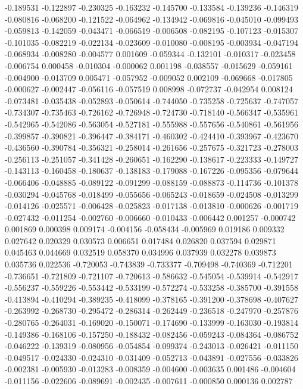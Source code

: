 -0.189531
-0.122897
-0.230325
-0.163232
-0.145700
-0.133584
-0.139236
-0.146319
-0.080816
-0.068200
-0.121522
-0.064962
-0.134942
-0.069816
-0.045010
-0.099493
-0.059813
-0.142059
-0.043471
-0.066519
-0.006508
-0.082195
-0.107123
-0.015307
-0.101035
-0.082219
-0.022134
-0.023609
-0.010080
-0.008195
-0.003934
-0.047194
-0.068934
-0.008280
-0.004577
0.001609
-0.059344
-0.132101
-0.010317
-0.023458
-0.006754
0.000458
-0.010304
-0.000062
0.001198
-0.038557
-0.015629
-0.059161
-0.004900
-0.013709
0.005471
-0.057952
-0.009052
0.002109
-0.069668
-0.017805
-0.000627
-0.002447
-0.056116
-0.057519
0.008998
-0.072737
-0.042954
0.008124
-0.073481
-0.035438
-0.052893
-0.050614
-0.744050
-0.735258
-0.725637
-0.747057
-0.734307
-0.735463
-0.726162
-0.726948
-0.724730
-0.718140
-0.566347
-0.535961
-0.542965
-0.542086
-0.563054
-0.527181
-0.555988
-0.557656
-0.540861
-0.561956
-0.399857
-0.390821
-0.396447
-0.384171
-0.460302
-0.424410
-0.393967
-0.423670
-0.436560
-0.390784
-0.356321
-0.258014
-0.261656
-0.257675
-0.321723
-0.278003
-0.256113
-0.251057
-0.341428
-0.260651
-0.162290
-0.138617
-0.223333
-0.149727
-0.143113
-0.160458
-0.180637
-0.138183
-0.179088
-0.167226
-0.095356
-0.079644
-0.066406
-0.048885
-0.089122
-0.091299
-0.088159
-0.088873
-0.114736
-0.101378
-0.030294
-0.045768
-0.018499
-0.055656
-0.065243
-0.018659
-0.024508
-0.013299
-0.014126
-0.025571
-0.006428
-0.025823
-0.017138
-0.013810
-0.000626
-0.001719
-0.027432
-0.011254
-0.002760
-0.006660
-0.010433
-0.006442
0.001257
-0.000742
0.001869
0.000398
0.009174
-0.004156
-0.058434
-0.005969
0.019186
0.009332
0.027642
0.020329
0.030573
0.006651
0.017484
0.026820
0.037594
0.029871
0.045463
0.044669
0.032519
0.058370
0.034996
0.037939
0.032278
0.039873
0.035736
0.022536
-0.720053
-0.743839
-0.733377
-0.709498
-0.740369
-0.712201
-0.736651
-0.721809
-0.721107
-0.720613
-0.586632
-0.545054
-0.539914
-0.542917
-0.556237
-0.559226
-0.553442
-0.533199
-0.572274
-0.533258
-0.385700
-0.391558
-0.413894
-0.410294
-0.389235
-0.418099
-0.378165
-0.391200
-0.378698
-0.407627
-0.263992
-0.268730
-0.295472
-0.286314
-0.262449
-0.236518
-0.247970
-0.257876
-0.280765
-0.264031
-0.169020
-0.150071
-0.174690
-0.133999
-0.163030
-0.193814
-0.149386
-0.168106
-0.157250
-0.188432
-0.082456
-0.059243
-0.084364
-0.086752
-0.046222
-0.139319
-0.080956
-0.054854
-0.099374
-0.243013
-0.026421
-0.011150
-0.049517
-0.024330
-0.024310
-0.031409
-0.052713
-0.043891
-0.027556
-0.033826
-0.002381
-0.005930
-0.013283
-0.008359
-0.004600
-0.003635
0.001486
-0.004604
-0.011156
-0.022606
-0.089691
-0.002435
-0.007611
-0.000850
0.000136
0.002787
